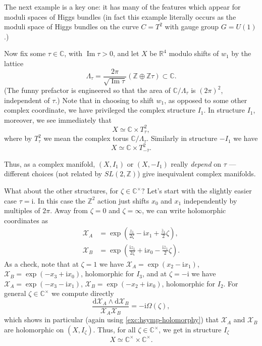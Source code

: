 \documentclass[12pt,letterpaper,reqno]{article}
\numberwithin{equation}{section}
\newcommand{\cX}{\ensuremath{\mathcal X}}
\newcommand{\R}{\ensuremath{\mathbb R}}
\newcommand{\C}{\ensuremath{\mathbb C}}
\newcommand{\Z}{\ensuremath{\mathbb Z}}
\newcommand{\I}{{\mathrm i}}
\newcommand{\de}{\mathrm{d}}
\newcommand{\ti}[1]{\textit{#1}}
\DeclareMathOperator{\im}{Im}
\begin{document}
The next example is a key one: it has many of the features
which appear for moduli spaces of Higgs bundles (in fact
this example literally occurs as the moduli space of
Higgs bundles on the curve $C = T^2$ with gauge group
$G = U(1)$.)
\begin{example}[$\R^2 \times T^2$] \label{exa:R2T2}
Now fix some $\tau \in \C$, with $\im \tau > 0$,
and let $X$ be $\R^4$ modulo shifts of $w_1$ by
the lattice
\begin{equation}
  \Lambda_\tau = \frac{2\pi}{\sqrt{\im \tau}}(\Z \oplus \Z \tau) \subset \C.
\end{equation}
(The funny prefactor is engineered
so that the area of $\C / \Lambda_\tau$
is $(2\pi)^2$, independent of $\tau$.)
Note that in choosing to shift $w_1$, as opposed to some other complex
coordinate, we have privileged the complex structure $I_1$.
In structure $I_1$, moreover, we see immediately that
\begin{equation}
  X \simeq \C \times T^2_\tau,
\end{equation}
where by $T^2_\tau$ we mean the complex
torus $\C / \Lambda_\tau$.
Similarly in structure $-I_1$ we have
\begin{equation}
  X \simeq \C \times T^2_{-\bar\tau}.
\end{equation}

Thus, as a complex manifold, $(X,I_1)$ or $(X,-I_1)$ really
\ti{depend} on $\tau$ --- different choices (not related by $SL(2,\Z)$)
give inequivalent complex manifolds.

What about the other structures, for $\zeta \in \C^\times$?
Let's start with the slightly easier case $\tau = \I$.
In this case the $\Z^2$ action just shifts $x_0$ and $x_1$
independently by multiples of $2\pi$.
Away from $\zeta = 0$ and $\zeta = \infty$, we can write
holomorphic coordinates as
\begin{align*}
  \cX_A &= \exp \left(\frac{z_1}{2\zeta} - \I x_1 + \frac{\bar{z}_1}{2} \zeta \right),\\
  \cX_B &= \exp \left(\frac{\I z_1}{2\zeta} + \I x_0 - \frac{\I \bar{z}_1}{2}  \zeta \right).
\end{align*}
As a check, note that at $\zeta = 1$ we have
$\cX_A = \exp(x_2 - \I x_1)$, $\cX_B = \exp(-x_3 + \I x_0)$, holomorphic
for $I_3$,
and at $\zeta = -\I$ we have
$\cX_A = \exp(- x_3 - \I x_1)$, $\cX_B = \exp(-x_2 + \I x_0)$,
holomorphic for $I_2$.
For general $\zeta \in \C^\times$ we compute directly
\begin{equation} \label{eq:hol-symp-R2T2}
  \frac{\de \cX_A \wedge \de \cX_B}{\cX_A \cX_B} = -\I \Omega(\zeta),
\end{equation}
which shows in particular (again using \autoref{exc:hsymp-holomorphy})
that $\cX_A$ and $\cX_B$ are holomorphic
on $(X,I_\zeta)$.
Thus, for all $\zeta \in \C^\times$, we get in structure $I_\zeta$
\begin{equation}
 X \simeq \C^\times \times \C^\times.
\end{equation}


\end{example}
\end{document}
